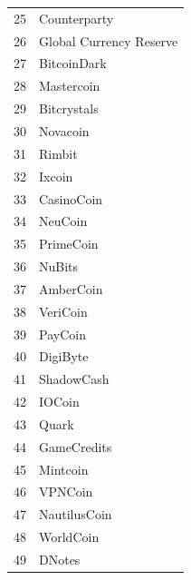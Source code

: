 \documentclass[a5paper, twoside]{book}
\begin{document}
\begin{center}
\begin{tabular}{ r | l }
    25 & Counterparty \\
    26 & Global Currency Reserve \\
    27 & BitcoinDark \\
    28 & Mastercoin \\
    29 & Bitcrystals \\
    30 & Novacoin \\
    31 & Rimbit \\
    32 & Ixcoin \\
    33 & CasinoCoin \\
    34 & NeuCoin \\
    35 & PrimeCoin \\
    36 & NuBits \\
    37 & AmberCoin \\
    38 & VeriCoin \\
    39 & PayCoin \\
    40 & DigiByte \\
    41 & ShadowCash \\
    42 & IOCoin \\
    43 & Quark \\
    44 & GameCredits \\
    45 & Mintcoin \\
    46 & VPNCoin \\
    47 & NautilusCoin \\
    48 & WorldCoin \\
    49 & DNotes \\
\end{tabular}
\end{center}
\newpage
\end{document}
